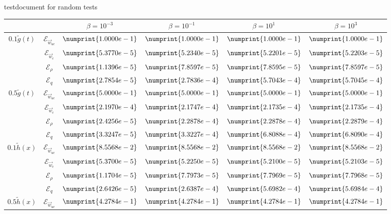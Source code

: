 \documentclass[11pt, a4paper]{article}
\theoremstyle{definition}
\newcommand{\adj}{q}
\begin{document}
testdocument for random tests
\begin{table}
	\centering
	\begin{tabular}{ | c | c || c | c | c | c ||}
		\hline
		\multicolumn{2}{|c||}{} & $\beta = 10^{-3}$ & $\beta = 10^{-1}$ & $\beta = 10^{1}$ & $\beta = 10^{3}$  \\
		\hline
		\hline
		\multirow{4}{*}{$0.1 \tilde g(t)$} & $\mathcal{E}_{\vec{w}_{uc}}$ & $\numprint{1.0000e-1}$ & $\numprint{1.0000e-1}$ & $\numprint{1.0000e-1}$ & $\numprint{1.0000e-1}$ \\
		& $\mathcal{E}_{\vec{w}_c}$ & $\numprint{5.3770e-5}$ & $\numprint{5.2340e-5}$ & $\numprint{5.2201e-5}$ & $\numprint{5.2203e-5}$ \\
		& $\mathcal{E}_{\rho}$ & $\numprint{1.1396e-5}$ & $\numprint{7.8597e-5}$ & $\numprint{7.8595e-5}$ & $\numprint{7.8597e-5}$ \\
		& $\mathcal{E}_{\adj}$ & $\numprint{2.7854e-5}$ & $\numprint{2.7836e-4}$ & $\numprint{5.7043e-4}$ & $\numprint{5.7045e-4}$ \\
		\hline
		\multirow{4}{*}{$0.5 \tilde g(t)$} & $\mathcal{E}_{\vec{w}_{uc}}$ & $\numprint{5.0000e-1}$ & $\numprint{5.0000e-1}$ & $\numprint{5.0000e-1}$ & $\numprint{5.0000e-1}$ \\
		& $\mathcal{E}_{\vec{w}_c}$ & $\numprint{2.1970e-4}$ & $\numprint{2.1747e-4}$ & $\numprint{2.1735e-4}$ & $\numprint{2.1735e-4}$ \\
		& $\mathcal{E}_{\rho}$ & $\numprint{2.4256e-5}$ & $\numprint{2.2878e-4}$ & $\numprint{2.2878e-4}$ & $\numprint{2.2879e-4}$ \\
		& $\mathcal{E}_{\adj}$ & $\numprint{3.3247e-5}$ & $\numprint{3.3227e-4}$ & $\numprint{6.8088e-4}$ & $\numprint{6.8090e-4}$ \\
		\hline
		\multirow{4}{*}{$0.1 \tilde h(x)$} & $\mathcal{E}_{\vec{w}_{uc}}$ & $\numprint{8.5568e-2}$ & $\numprint{8.5568e-2}$ & $\numprint{8.5568e-2}$ & $\numprint{8.5568e-2}$ \\
		& $\mathcal{E}_{\vec{w}_c}$ & $\numprint{5.3700e-5}$ & $\numprint{5.2250e-5}$ & $\numprint{5.2100e-5}$ & $\numprint{5.2103e-5}$ \\
		& $\mathcal{E}_{\rho}$ & $\numprint{1.1704e-5}$ & $\numprint{7.7973e-5}$ & $\numprint{7.7969e-5}$ & $\numprint{7.7968e-5}$ \\
		& $\mathcal{E}_{\adj}$ & $\numprint{2.6426e-5}$ & $\numprint{2.6387e-4}$ & $\numprint{5.6982e-4}$ & $\numprint{5.6984e-4}$ \\
		\hline
		\multirow{4}{*}{$0.5 \tilde h(x)$} & $\mathcal{E}_{\vec{w}_{uc}}$ & $\numprint{4.2784e-1}$ & $\numprint{4.2784e-1}$ & $\numprint{4.2784e-1}$ & $\numprint{4.2784e-1}$ \\

\end{tabular}
\end{table}
\end{document}
